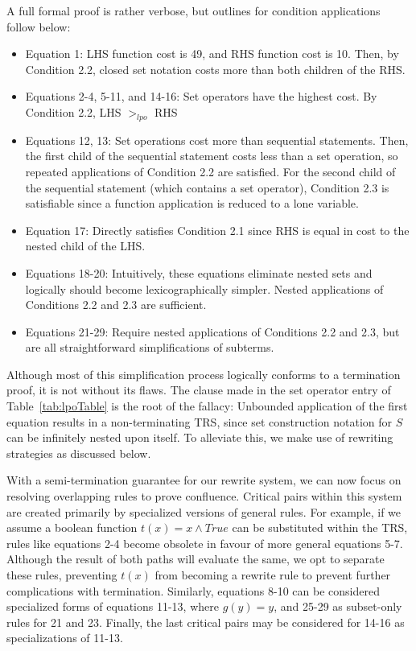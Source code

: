 \documentclass{article}
\begin{document}
A full formal proof is rather verbose, but outlines for condition applications follow below:
\begin{itemize}
  \item Equation 1: LHS function cost is 49, and RHS function cost is 10. Then, by Condition 2.2, closed set notation costs more than both children of the RHS.
  \item Equations 2-4, 5-11, and 14-16: Set operators have the highest cost. By Condition 2.2, LHS $>_{lpo}$ RHS
  \item Equations 12, 13: Set operations cost more than sequential statements. Then, the first child of the sequential statement costs less than a set operation, so repeated applications of Condition 2.2 are satisfied. For the second child of the sequential statement (which contains a set operator), Condition 2.3 is satisfiable since a function application is reduced to a lone variable.
  \item Equation 17: Directly satisfies Condition 2.1 since RHS is equal in cost to the nested child of the LHS.
  \item Equations 18-20: Intuitively, these equations eliminate nested sets and logically should become lexicographically simpler. Nested applications of Conditions 2.2 and 2.3 are sufficient.
  \item Equations 21-29: Require nested applications of Conditions 2.2 and 2.3, but are all straightforward simplifications of subterms.
\end{itemize}
Although most of this simplification process logically conforms to a termination proof, it is not without its flaws. The clause made in the set operator entry of Table~\ref{tab:lpoTable} is the root of the fallacy: Unbounded application of the first equation results in a non-terminating TRS, since set construction notation for $S$ can be infinitely nested upon itself. To alleviate this, we make use of rewriting strategies as discussed below.

With a semi-termination guarantee for our rewrite system, we can now focus on resolving overlapping rules to prove confluence. Critical pairs within this system are created primarily by specialized versions of general rules. For example, if we assume a boolean function $t(x) = x \land True$ can be substituted within the TRS, rules like equations 2-4 become obsolete in favour of more general equations 5-7. Although the result of both paths will evaluate the same, we opt to separate these rules, preventing $t(x)$ from becoming a rewrite rule to prevent further complications with termination. Similarly, equations 8-10 can be considered specialized forms of equations 11-13, where $g(y) = y$, and 25-29 as subset-only rules for 21 and 23. Finally, the last critical pairs may be considered for 14-16 as specializations of 11-13.
\end{document}
